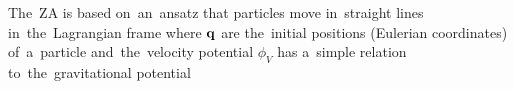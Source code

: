 The~ZA is based on~an~ansatz that particles move in~straight lines in~the~Lagrangian frame
where $\mathbf q$ are the~initial positions (Eulerian coordinates) of~a~particle and~the~velocity potential $\phi_V$ has a~simple relation to~the~gravitational potential



